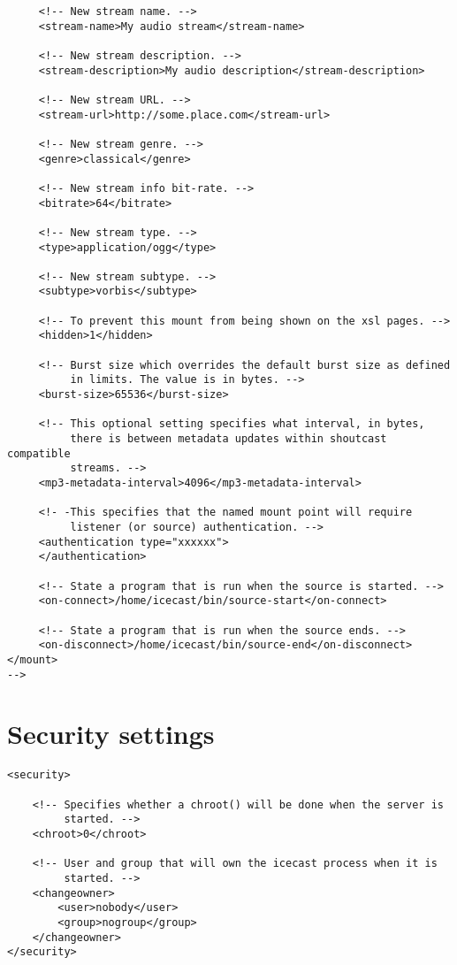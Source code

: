\begin{lstlisting}
     <!-- New stream name. -->
     <stream-name>My audio stream</stream-name>

     <!-- New stream description. -->
     <stream-description>My audio description</stream-description>

     <!-- New stream URL. -->
     <stream-url>http://some.place.com</stream-url>

     <!-- New stream genre. -->
     <genre>classical</genre>

     <!-- New stream info bit-rate. -->
     <bitrate>64</bitrate>

     <!-- New stream type. -->
     <type>application/ogg</type>

     <!-- New stream subtype. -->
     <subtype>vorbis</subtype>

     <!-- To prevent this mount from being shown on the xsl pages. -->
     <hidden>1</hidden>

     <!-- Burst size which overrides the default burst size as defined
          in limits. The value is in bytes. -->
     <burst-size>65536</burst-size>

     <!-- This optional setting specifies what interval, in bytes,
          there is between metadata updates within shoutcast compatible
          streams. -->
     <mp3-metadata-interval>4096</mp3-metadata-interval>

     <!- -This specifies that the named mount point will require
          listener (or source) authentication. -->
     <authentication type="xxxxxx">
     </authentication>

     <!-- State a program that is run when the source is started. -->
     <on-connect>/home/icecast/bin/source-start</on-connect>

     <!-- State a program that is run when the source ends. -->
     <on-disconnect>/home/icecast/bin/source-end</on-disconnect>
</mount>
-->
\end{lstlisting}


\section{Security settings}

\begin{lstlisting}
<security>

    <!-- Specifies whether a chroot() will be done when the server is
         started. -->
    <chroot>0</chroot>

    <!-- User and group that will own the icecast process when it is
         started. -->
    <changeowner>
        <user>nobody</user>
        <group>nogroup</group>
    </changeowner>
</security>
\end{lstlisting}

